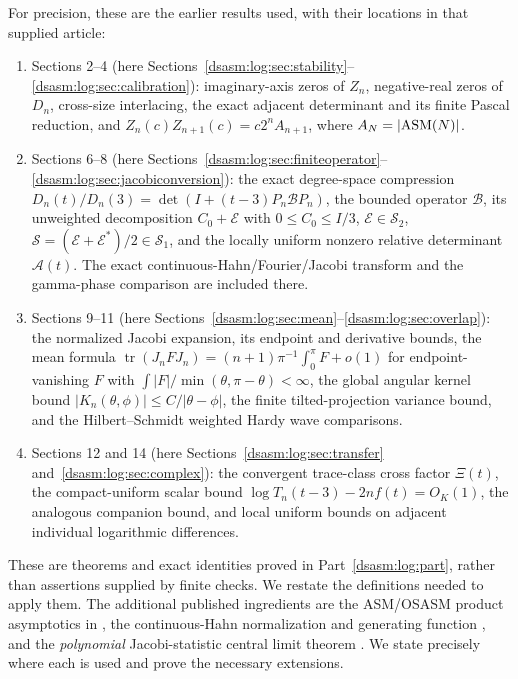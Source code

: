 \documentclass[11pt,letterpaper]{article}
\theoremstyle{remark}\newtheorem{remark}[theorem]{Remark}
\newcommand{\Sone}{\mathcal S_1}\newcommand{\Stwo}{\mathcal S_2}
\DeclareMathOperator{\tr}{tr}\DeclareMathOperator{\Ran}{Ran}
\begin{document}
For precision, these are the earlier results used, with their locations
in that supplied article:
\begin{enumerate}[label=\textup{(I\arabic*)}]
\item Sections 2--4 (here Sections~\ref{dsasm:log:sec:stability}--\ref{dsasm:log:sec:calibration}): imaginary-axis zeros of $Z_n$, negative-real zeros
of $D_n$, cross-size interlacing, the exact adjacent determinant and
its finite Pascal reduction, and
$Z_n(c)Z_{n+1}(c)=c2^n A_{n+1}$, where $A_N=|\mathrm{ASM}(N)|$.
\item Sections 6--8 (here Sections~\ref{dsasm:log:sec:finiteoperator}--\ref{dsasm:log:sec:jacobiconversion}): the exact degree-space compression
$D_n(t)/D_n(3)=\det(I+(t-3)P_n\mathcal B P_n)$, the bounded operator
$\mathcal B$, its unweighted decomposition $C_0+\mathcal E$ with
$0\le C_0\le I/3$, $\mathcal E\in\Stwo$,
$\mathcal S=(\mathcal E+\mathcal E^*)/2\in\Sone$, and the locally
uniform nonzero relative determinant $\mathcal A(t)$.
The exact continuous-Hahn/Fourier/Jacobi transform and the gamma-phase
comparison are included there.
\item Sections 9--11 (here Sections~\ref{dsasm:log:sec:mean}--\ref{dsasm:log:sec:overlap}): the normalized Jacobi expansion, its endpoint
and derivative bounds, the mean formula
$\tr(J_nFJ_n)=(n+1)\pi^{-1}\int_0^\pi F+o(1)$ for endpoint-vanishing
$F$ with $\int |F|/\min(\theta,\pi-\theta)<\infty$, the global
angular kernel bound $|K_n(\theta,\phi)|\le C/|\theta-\phi|$, the
finite tilted-projection variance bound, and the Hilbert--Schmidt
weighted Hardy wave comparisons.
\item Sections 12 and 14 (here Sections~\ref{dsasm:log:sec:transfer} and~\ref{dsasm:log:sec:complex}): the convergent trace-class cross factor
$\Xi(t)$, the compact-uniform scalar bound
$\log T_n(t-3)-2nf(t)=O_K(1)$, the analogous companion bound, and
local uniform bounds on adjacent individual logarithmic differences.
\end{enumerate}
These are theorems and exact identities proved in Part~\ref{dsasm:log:part}, rather
than assertions supplied by finite checks. We restate the definitions
needed to apply them. The additional published ingredients are the
ASM/OSASM product asymptotics in \cite{bfk}, the continuous-Hahn
normalization and generating function \cite{cll,dlmf}, and the
\emph{polynomial} Jacobi-statistic central limit theorem \cite{bd}.
We state precisely where each is used and prove the necessary extensions.
\end{document}
